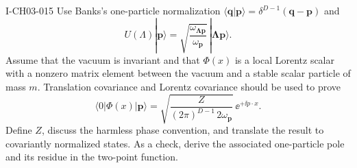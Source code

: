 \begin{exercise}{I-CH03-015}
Use Banks's one-particle normalization
\(\langle\mathbf q|\mathbf p\rangle=\delta^{D-1}(\mathbf q-\mathbf p)\) and
\[
 U(\Lambda)|\mathbf p\rangle
 =\sqrt{\frac{\omega_{\boldsymbol{\Lambda p}}}{\omega_{\mathbf p}}}\,|\boldsymbol{\Lambda p}\rangle.
\]
Assume that the vacuum is invariant and that $\Phi(x)$ is a local Lorentz
scalar with a nonzero matrix element between the vacuum and a stable scalar
particle of mass $m$.  Translation covariance and Lorentz covariance should
be used to prove
\[
 \langle0|\Phi(x)|\mathbf p\rangle
 =\sqrt{\frac{Z}{(2\pi)^{D-1}\,2\omega_{\mathbf p}}}\,\ee^{+\ii p\mathbin{\cdot}x}.
\]
Define $Z$, discuss the harmless phase convention, and translate the result
to covariantly normalized states.  As a check, derive the associated
one-particle pole and its residue in the two-point function.
\end{exercise}
